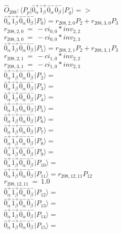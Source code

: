 \documentclass[14pt]{article}
\begin{document}
    $\hat{O}_{208}:  \langle{P_p}\vert \hat{0}_{\alpha}^{+}\hat{1}_{\beta}^{+}\hat{0}_{\alpha}^{-}\hat{0}_{\beta}^{-} \vert{P_q}\rangle => $ \\ 
    $ \hat{0}_{\alpha}^{+}\hat{1}_{\beta}^{+}\hat{0}_{\alpha}^{-}\hat{0}_{\beta}^{-} \vert{P_{0}}\rangle = {r}_{208,2,0}P_{2}+{r}_{208,3,0}P_{3} $ \\ 
    ${r}_{208,2,0}\ =\ -{ci}_{0,0}*{inv}_{2,2} $ \\ 
    ${r}_{208,3,0}\ =\ -{ci}_{0,0}*{inv}_{2,3} $ \\ 
    $ \hat{0}_{\alpha}^{+}\hat{1}_{\beta}^{+}\hat{0}_{\alpha}^{-}\hat{0}_{\beta}^{-} \vert{P_{1}}\rangle = {r}_{208,2,1}P_{2}+{r}_{208,3,1}P_{3} $ \\ 
    ${r}_{208,2,1}\ =\ -{ci}_{1,0}*{inv}_{2,2} $ \\ 
    ${r}_{208,3,1}\ =\ -{ci}_{1,0}*{inv}_{2,3} $ \\ 
    $ \hat{0}_{\alpha}^{+}\hat{1}_{\beta}^{+}\hat{0}_{\alpha}^{-}\hat{0}_{\beta}^{-} \vert{P_{2}}\rangle =  $ \\ 
    $ \hat{0}_{\alpha}^{+}\hat{1}_{\beta}^{+}\hat{0}_{\alpha}^{-}\hat{0}_{\beta}^{-} \vert{P_{3}}\rangle =  $ \\ 
    $ \hat{0}_{\alpha}^{+}\hat{1}_{\beta}^{+}\hat{0}_{\alpha}^{-}\hat{0}_{\beta}^{-} \vert{P_{4}}\rangle =  $ \\ 
    $ \hat{0}_{\alpha}^{+}\hat{1}_{\beta}^{+}\hat{0}_{\alpha}^{-}\hat{0}_{\beta}^{-} \vert{P_{5}}\rangle =  $ \\ 
    $ \hat{0}_{\alpha}^{+}\hat{1}_{\beta}^{+}\hat{0}_{\alpha}^{-}\hat{0}_{\beta}^{-} \vert{P_{6}}\rangle =  $ \\ 
    $ \hat{0}_{\alpha}^{+}\hat{1}_{\beta}^{+}\hat{0}_{\alpha}^{-}\hat{0}_{\beta}^{-} \vert{P_{7}}\rangle =  $ \\ 
    $ \hat{0}_{\alpha}^{+}\hat{1}_{\beta}^{+}\hat{0}_{\alpha}^{-}\hat{0}_{\beta}^{-} \vert{P_{8}}\rangle =  $ \\ 
    $ \hat{0}_{\alpha}^{+}\hat{1}_{\beta}^{+}\hat{0}_{\alpha}^{-}\hat{0}_{\beta}^{-} \vert{P_{9}}\rangle =  $ \\ 
    $ \hat{0}_{\alpha}^{+}\hat{1}_{\beta}^{+}\hat{0}_{\alpha}^{-}\hat{0}_{\beta}^{-} \vert{P_{10}}\rangle =  $ \\ 
    $ \hat{0}_{\alpha}^{+}\hat{1}_{\beta}^{+}\hat{0}_{\alpha}^{-}\hat{0}_{\beta}^{-} \vert{P_{11}}\rangle = {r}_{208,12,11}P_{12} $ \\ 
    ${r}_{208,12,11}\ =\ 1.0 $ \\ 
    $ \hat{0}_{\alpha}^{+}\hat{1}_{\beta}^{+}\hat{0}_{\alpha}^{-}\hat{0}_{\beta}^{-} \vert{P_{12}}\rangle =  $ \\ 
    $ \hat{0}_{\alpha}^{+}\hat{1}_{\beta}^{+}\hat{0}_{\alpha}^{-}\hat{0}_{\beta}^{-} \vert{P_{13}}\rangle =  $ \\ 
    $ \hat{0}_{\alpha}^{+}\hat{1}_{\beta}^{+}\hat{0}_{\alpha}^{-}\hat{0}_{\beta}^{-} \vert{P_{14}}\rangle =  $ \\ 
    $ \hat{0}_{\alpha}^{+}\hat{1}_{\beta}^{+}\hat{0}_{\alpha}^{-}\hat{0}_{\beta}^{-} \vert{P_{15}}\rangle =  $ \\ 
    
\end{document}
